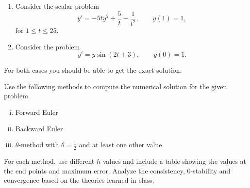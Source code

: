 \begin{problem}[Handout]
  \begin{enumerate}
    \item Consider the scalar problem
    \[
      y' = -5ty^2 + \frac{5}{t} - \frac{1}{t^2}, \qquad y(1) = 1,
    \]
    for $1 \leq t \leq 25$.
    \item Consider the problem
    \[
      y' = y \sin(2t + 3), \qquad y(0) = 1.
    \]
  \end{enumerate}
  For both cases you should be able to get the exact solution.
  
  Use the following methods to compute the numerical solution for the given problem.
  \begin{enumerate}[(i)]
    \item Forward Euler
    \item Backward Euler
    \item $\theta$-method with $\theta = \frac12$ and at least one other value.
  \end{enumerate}
  
  For each method, use different $h$ values and include a table showing the values at the end points and maximum error. Analyze the consistency, $0$-stability and convergence based on the theories learned in class. 
\end{problem}

